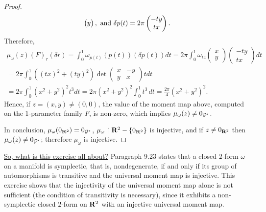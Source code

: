 \begin{proof}
$$\begin{pmatrix}
    y
    \end{pmatrix}, 
    \ \text{and}\ 
    \delta p(t) = 2\pi
    \begin{pmatrix} 
    -ty \\
    tx
    \end{pmatrix}.
    $$
  Therefore,
  \begin{multline*}
    \mu_\omega(z)(F)_r(\delta r)
    =
    \int_0^1\omega_{p(t)}(\dot p(t))(\delta p(t)) dt
    = 2\pi \int_0^1\omega_{tz}
    \begin{pmatrix} 
      x \\
      y
    \end{pmatrix}
    \begin{pmatrix}
      -ty \\
      tx
    \end{pmatrix}
     dt
    \\
    =
   2\pi \int_0^1 ((tx)^2 + (ty)^2) \det
    \begin{pmatrix} 
      x & -y \\
      y & x 
    \end{pmatrix}  t dt
    \\
    =  2\pi \int_0^1 (x^2 + y^2)^2 t^3  dt
    = 2\pi (x^2 + y^2)^2 \int_0^1  t^3 \, dt
    = \frac{2\pi}{4} (x^2 + y^2)^2.
  \end{multline*}
  Hence,
  if $z=(x,y) \neq (0,0)$,
  the value of the moment map above,
  computed on the $1$-parameter family $F$,
  is non-zero,
   which implies $\mu_\omega(z) \neq 0_{\mathcal{G}^*}$.
  
  In conclusion, $\mu_\omega(0_{\mathbf{R}^2}) = 0_{\mathcal{G}^*}$, 
  $\mu_\omega \restriction \mathbf{R}^2 - \{0_{\mathbf{R}^2}\}$ is injective,
  and if $z \neq 0_{\mathbf{R}^2}$ then $\mu_\omega(z) \neq  0_{\mathcal{G}^*}$;
  therefore $\mu_\omega$ is injective.
\end{proof}

\bigskip
\uline{So, what is this exercise all about?} Paragraph 9.23 states that a closed
$2$-form $\omega$ on a manifold is symplectic,
that is,
nondegenerate,
if and only if its group of automorphisms is transitive and the universal moment map is injective.
This exercise shows that the injectivity of the universal moment map alone is not sufficient
(the condition of transitivity is necessary), 
since it exhibits a non-symplectic closed $2$-form on $\mathbf{R}^2$ with an injective universal moment map.

